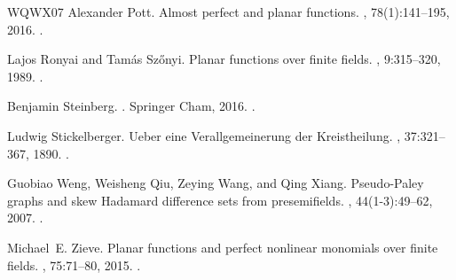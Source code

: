 \documentclass[12pt]{article}
\begin{document}
\begin{thebibliography}{WQWX07}
Alexander Pott.
\newblock Almost perfect and planar functions.
, 78(1):141--195, 2016.
\newblock \href {https://doi.org/10.1007/S10623-015-0151-X}
  {}.

Lajos Ronyai and Tam{\'{a}}s Sz{\H{o}}nyi.
\newblock Planar functions over finite fields.
, 9:315--320, 1989.
\newblock \href {https://doi.org/10.1007/BF02125898}
  {}.

Benjamin Steinberg.
.
\newblock Springer Cham, 2016.
\newblock \href {https://doi.org/10.1007/978-3-319-43932-7}
  {}.

Ludwig Stickelberger.
\newblock Ueber eine {Verallgemeinerung} der {Kreistheilung}.
, 37:321--367, 1890.
\newblock \href {https://doi.org/10.1007/BF01721360}
  {}.

Guobiao Weng, Weisheng Qiu, Zeying Wang, and Qing Xiang.
\newblock Pseudo-{Paley} graphs and skew {Hadamard} difference sets from
  presemifields.
, 44(1-3):49--62, 2007.
\newblock \href {https://doi.org/10.1007/S10623-007-9057-6}
  {}.

Michael~E. Zieve.
\newblock Planar functions and perfect nonlinear monomials over finite fields.
, 75:71--80, 2015.
\newblock \href {https://doi.org/10.1007/s10623-013-9890-8}
  {}.

\end{thebibliography}
\end{document}
